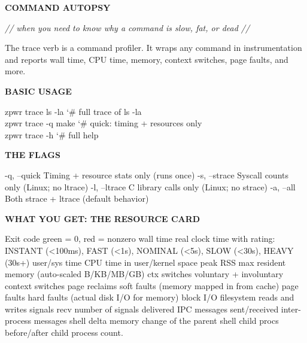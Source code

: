 \documentclass[11pt,a4paper,twoside]{book}
\begin{document}
\vspace{10pt}
{\large\bfseries\color{neoncyan} COMMAND AUTOPSY}\vspace{6pt}

{\small\itshape\color{dimtext} // when you need to know why a command is slow, fat, or dead //}

The trace verb is a command profiler. It wraps any command in instrumentation and reports wall time, CPU time, memory, context switches, page faults, and more.


\vspace{12pt}
{\bfseries\color{neonyellow} BASIC USAGE}\vspace{4pt}

\begin{codebox}
\color{neongreen}zpwr trace ls -la                   {\char`\#} full trace of ls -la\\
\color{neongreen}zpwr trace -q make                  {\char`\#} quick: timing + resources only\\
\color{neongreen}zpwr trace -h                       {\char`\#} full help\\
\end{codebox}


\vspace{12pt}
{\bfseries\color{neonyellow} THE FLAGS}\vspace{4pt}

-q, --quick      Timing + resource stats only (runs once) -s, --strace     Syscall counts only (Linux; no ltrace) -l, --ltrace     C library calls only (Linux; no strace) -a, --all        Both strace + ltrace (default behavior)


\vspace{12pt}
{\bfseries\color{neonyellow} WHAT YOU GET: THE RESOURCE CARD}\vspace{4pt}

Exit code          green = 0, red = nonzero wall time          real clock time with rating: INSTANT (<100ms), FAST (<1s), NOMINAL (<5s), SLOW (<30s), HEAVY (30s+) user/sys time      CPU time in user/kernel space peak RSS           max resident memory (auto-scaled B/KB/MB/GB) ctx switches       voluntary + involuntary context switches page reclaims      soft faults (memory mapped in from cache) page faults        hard faults (actual disk I/O for memory) block I/O          filesystem reads and writes signals recv       number of signals delivered IPC messages       sent/received inter-process messages shell delta        memory change of the parent shell child procs        before/after child process count.
\end{document}
